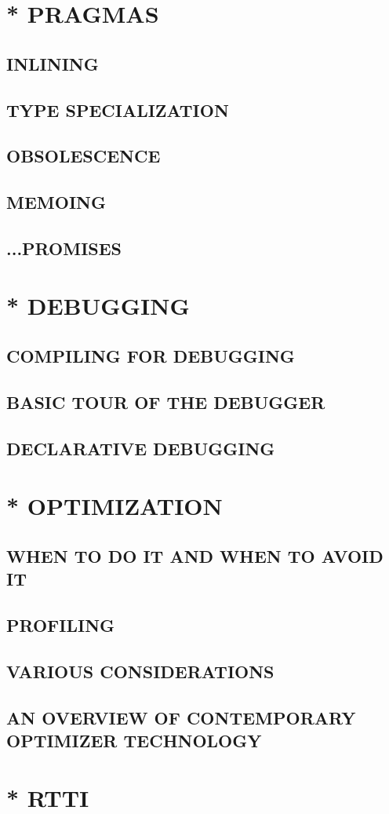 \documentclass[a4paper,11pt,notitlepage,onecolumn]{article}
\begin{document}
\section{* PRAGMAS}
\subsection{INLINING}
\subsection{TYPE SPECIALIZATION}
\subsection{OBSOLESCENCE}
\subsection{MEMOING}
\subsection{...PROMISES}



\section{* DEBUGGING}
\subsection{COMPILING FOR DEBUGGING}
\subsection{BASIC TOUR OF THE DEBUGGER}
\subsection{DECLARATIVE DEBUGGING}



\section{* OPTIMIZATION}
\subsection{WHEN TO DO IT AND WHEN TO AVOID IT}
\subsection{PROFILING}
\subsection{VARIOUS CONSIDERATIONS}
\subsection{AN OVERVIEW OF CONTEMPORARY OPTIMIZER TECHNOLOGY}



\section{* RTTI}
\end{document}
